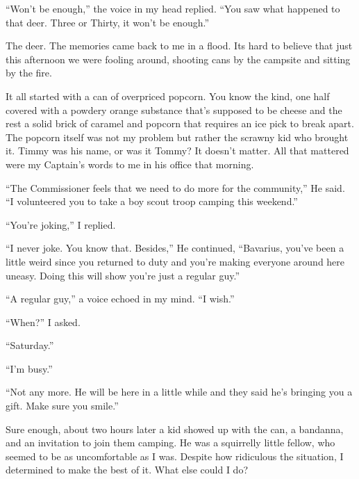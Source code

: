 ``Won't be enough,'' the voice in my head replied. ``You saw what
happened to that deer. Three or Thirty, it won't be enough.''



The deer. The memories came back to me in a flood. Its hard to
believe that just this afternoon we were fooling around, shooting
cans by the campsite and sitting by the fire.



It all started with a can of overpriced popcorn. You know the kind,
one half covered with a powdery orange substance that's supposed to
be cheese and the rest a solid brick of caramel and popcorn that
requires an ice pick to break apart. The popcorn itself was not my
problem but rather the scrawny kid who brought it. Timmy was his
name, or was it Tommy? It doesn't matter. All that mattered were my
Captain's words to me in his office that morning.



``The Commissioner feels that we need to do more for the community,''
He said. ``I volunteered you to take a boy scout troop camping this
weekend.''



``You're joking,'' I replied.



``I never joke. You know that. Besides,'' He continued, ``Bavarius,
you've been a little weird since you returned to duty and you're
making everyone around here uneasy. Doing this will show you're
just a regular guy.''



``A regular guy,'' a voice echoed in my mind. ``I wish.''



``When?'' I asked.



``Saturday.''



``I'm busy.''



``Not any more. He will be here in a little while and they said he's
bringing you a gift. Make sure you smile.''



Sure enough, about two hours later a kid showed up with the can, a
bandanna, and an invitation to join them camping. He was a
squirrelly little fellow, who seemed to be as uncomfortable as I
was. Despite how ridiculous the situation, I determined to make the
best of it. What else could I do?



